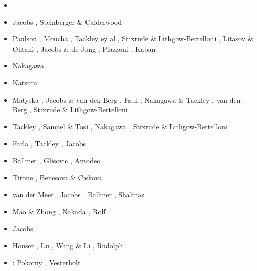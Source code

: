 \begin{scriptsize}
\begin{itemize}
\item[\twothousandfive] \cite{hett05}\cite{nata05b}\cite{nabu05}\cite{stli05}\cite{stli05b}
\item[\twothousandsix] Jacobs \etal \cite{javd06}, Steinberger \& Calderwood \cite{stca06}
\item[\twothousandseven] Paulson \etal \cite{pazw07}, Moucha \etal \cite{mofm07}, 
                   Tackley ey al \cite{tanh07}, Stixrude \& Lithgow-Bertelloni \cite{stli07}, 
                   Litasov \& Ohtani \cite{lioh07}, Jacobs \& de Jong \cite{jade07},
                   Piazzoni \etal \cite{pisb07}, Kaban \etal \cite{kart07}
\item[\twothousandnine] Nakagawa \etal \cite{natd09}
\item[\twothousandten] Katsura \etal \cite{kayy10}
\item[\twothousandeleven] Matyska \etal \cite{mayw11}, Jacobs \& van den Berg \cite{java11}, 
                    Faul \etal \cite{faff11}, Nakagawa \& Tackley \cite{nata11}, 
                    van den Berg \etal \cite{vayj11}, Stixrude \& Lithgow-Bertelloni \cite{stli11}
\item[\twothousandtwelve] Tackley \cite{tack12}, Samuel \& Tosi \cite{sato12}, 
                    Nakagawa \etal \cite{natd12}, Stixrude \& Lithgow-Bertelloni \cite{stli12}
\item[\twothousandthirteen] Farla \etal \cite{fakc13}, Tackley \etal \cite{taab13}, Jacobs \etal \cite{jasv13}
\item[\twothousandfifteen] Ballmer \etal \cite{basn15}, Glisovic \etal \cite{glfa15}, Amodeo \etal \cite{amsb15}
\item[\twothousandsixteen] Tirone \cite{tiro16}, Benesova \& Ciskova \cite{beci16}
\item[\twothousandseventeen] van der Meer \etal \cite{vavs17}, Jacobs \etal \cite{jasv17}, 
                             Ballmer \etal \cite{bahh17}, Shahnas \etal \cite{shyp17,shpj17}
\item[\twothousandeighteen] Mao \& Zhong \cite{mazh18}, Nakada \etal \cite{naoi18}, Rolf \etal \cite{roct18}
\item[\twothousandnineteen] Jacobs \etal \cite{jasv19}
\item[\twothousandtwenty] Houser \etal \cite{hohv20}, Lu \etal{} \cite{lufs20}, Wang \& Li \cite{wali20},
                          Rudolph \etal \cite{ruml20}
\item[\twothousandtwentyone]: Pokorny \etal \cite{pocv21}, Vesterholt \etal \cite{vepn21}
\end{itemize}
\end{scriptsize}


